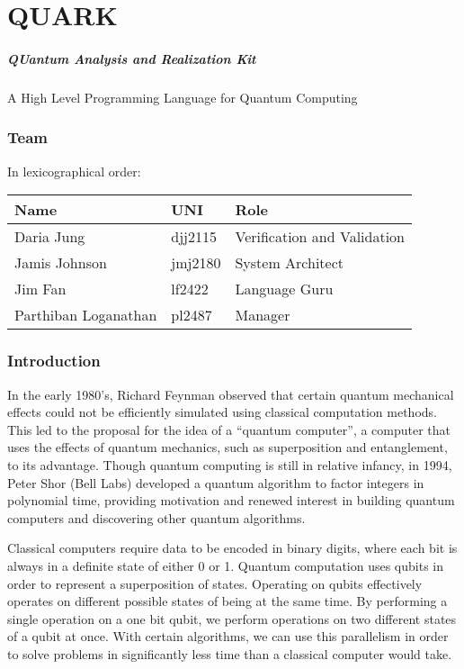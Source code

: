 \documentclass[]{article}
\date{}
\begin{document}
\section{QUARK}\label{quark}

\subparagraph{QUantum Analysis and Realization
Kit}\label{quantum-analysis-and-realization-kit}

A High Level Programming Language for Quantum Computing

\subsubsection{Team}\label{team}

In lexicographical order:

\begin{longtable}[c]{@{}lll@{}}
\toprule
Name & UNI & Role\tabularnewline
\midrule
\endhead
Daria Jung & djj2115 & Verification and Validation\tabularnewline
Jamis Johnson & jmj2180 & System Architect\tabularnewline
Jim Fan & lf2422 & Language Guru\tabularnewline
Parthiban Loganathan & pl2487 & Manager\tabularnewline
\bottomrule
\end{longtable}

\subsubsection{Introduction}\label{introduction}

In the early 1980's, Richard Feynman observed that certain quantum
mechanical effects could not be efficiently simulated using classical
computation methods. This led to the proposal for the idea of a
``quantum computer'', a computer that uses the effects of quantum
mechanics, such as superposition and entanglement, to its advantage.
Though quantum computing is still in relative infancy, in 1994, Peter
Shor (Bell Labs) developed a quantum algorithm to factor integers in
polynomial time, providing motivation and renewed interest in building
quantum computers and discovering other quantum algorithms.

Classical computers require data to be encoded in binary digits, where
each bit is always in a definite state of either 0 or 1. Quantum
computation uses qubits in order to represent a superposition of states.
Operating on qubits effectively operates on different possible states of
being at the same time. By performing a single operation on a one bit
qubit, we perform operations on two different states of a qubit at once.
With certain algorithms, we can use this parallelism in order to solve
problems in significantly less time than a classical computer would
take.
\end{document}
